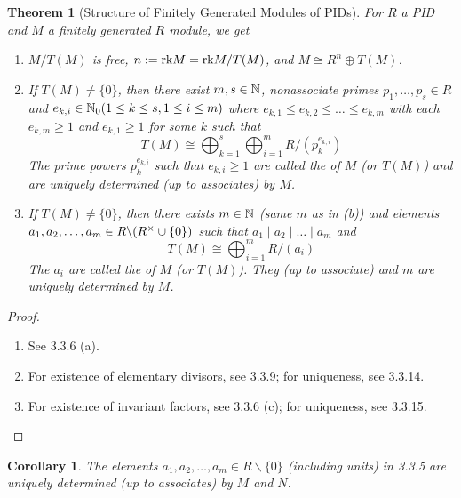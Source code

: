 \documentclass[11pt]{book}
\newcounter{counter}
\newtheorem{theorem}[counter]{Theorem}   \newtheorem*{theorem*}{Theorem}   \newtheorem{lemma}[counter]{Lemma}   \newtheorem{corollary}[counter]{Corollary}
\theoremstyle{definition}   \newtheorem{defn}[counter]{Definition} %
\newcommand{\bs}{\backslash}   \newcommand{\A}{\mathcal{A}}   \newcommand{\sy}{\textnormal{Syl}}   \newcommand{\size}[1]{\left| #1 \right|}
\newcommand{\vs}{\vspace{8pt}}
\numberwithin{counter}{chapter}
\begin{document}
\vs

\begin{theorem}[Structure of Finitely Generated Modules of PIDs]
For $R$ a PID and $M$ a finitely generated $R$ module, we get
\begin{enumerate}
\item[(a)] $M/T(M)$ is free, $n := \textnormal{rk} M = \textnormal{rk} M/T(M)$, and $M \cong R^n \oplus T(M)$.
\item[(b)] If $T(M) \ne \{0\}$, then there exist $m,s \in \operatorname{\mathbb{N}}$, nonassociate primes $p_1,\dots,p_s \in R$ and $e_{k,i} \in \operatorname{\mathbb{N}}_0 (1 \leq k \leq s, 1 \leq i \leq m)$ where $e_{k,1} \leq e_{k,2} \leq \dots \leq e_{k,m}$ with each $e_{k,m} \geq 1$ and $e_{k,1} \geq 1$ for some $k$ such that
	\[T(M) \cong \bigoplus_{k=1}^s \bigoplus_{i=1}^m R/(p_k^{e_{k,i}}) \]
The prime powers $p_k^{e_{k,i}}$ such that $e_{k,i} \geq 1$ are called the  of $M$ (or $T(M)$) and are uniquely determined (up to associates) by $M$.
\item[(c)] If $T(M) \ne \{0\}$, then there exists $m \in \operatorname{\mathbb{N}}$ (same $m$ as in (b)) and elements $a_1,a_2,\dots,a_m \in R \bs (R\x \cup \{0\})$ such that $a_1 \mid a_2 \mid \dots \mid a_m$ and
	\[T(M) \cong \bigoplus_{i=1}^m R/(a_i) \]
The $a_i$ are called the  of $M$ (or $T(M)$). They (up to associate) and $m$ are uniquely determined by $M$.
\end{enumerate}
\end{theorem}

\begin{proof}\
\begin{enumerate}
\item[(a)] See 3.3.6 (a).
\item[(b)] For existence of elementary divisors, see 3.3.9; for uniqueness, see 3.3.14.
\item[(c)] For existence of invariant factors, see 3.3.6 (c); for uniqueness, see 3.3.15.
\end{enumerate}
\end{proof}

\vs

\begin{corollary}
The elements $a_1,a_2,\dots,a_m \in R\bs\{0\}$ (including units) in 3.3.5 are uniquely determined (up to associates) by $M$ and $N$.
\end{corollary}
\end{document}
